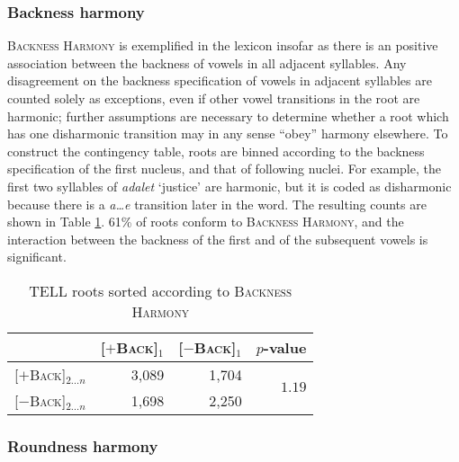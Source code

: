 \subsubsection{Backness harmony}

\textsc{Backness Harmony} is exemplified in the lexicon insofar as there is an positive association between the backness of vowels in all adjacent syllables. Any disagreement on the backness specification of vowels in adjacent syllables are counted solely as exceptions, even if other vowel transitions in the root are harmonic; further assumptions are necessary to determine whether a root which has one disharmonic transition may in any sense ``obey'' harmony elsewhere.
To construct the contingency table, roots are binned according to the backness specification of the first nucleus, and that of following nuclei. For example, the first two syllables of \emph{adalet} `justice' are harmonic, but it is coded as disharmonic because there is a \emph{a\ldots{}e} transition later in the word. The resulting counts are shown in Table \ref{bhs}. 61\% of roots conform to \textsc{Backness Harmony}, and the interaction between the backness of the first and of the subsequent vowels
is significant.

\begin{table}[t]
\centering
\begin{tabular}{lrrr}
\toprule
                             & [$+$\textsc{Back}]$_1$ & [$-$\textsc{Back}]$_1$ & $p$-value                     \\
\midrule
\buf{}[$+$\textsc{Back}]$_{2\ldots{}n}$ & 3,089                     & 1,704              & \multirow{2}{*}{$1.19$\e{-89}} \\
\buf{}[$-$\textsc{Back}]$_{2\ldots{}n}$ & 1,698                     & 2,250                                               \\
\bottomrule
\end{tabular}
\caption{TELL roots sorted according to \textsc{Backness Harmony}}
\label{bhs}
\end{table}

\subsubsection{Roundness harmony}

